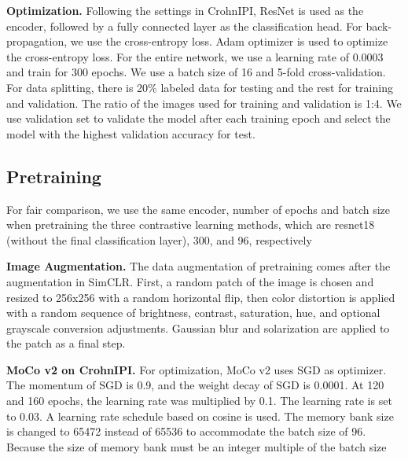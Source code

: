 \documentclass[conference]{IEEEtran}
\begin{document}
\textbf{Optimization.}
Following the settings in CrohnIPI\cite{crohIPI}, ResNet is used as the encoder, followed by a fully connected layer as the classification head. For back-propagation, we use the cross-entropy loss.
Adam optimizer is used to optimize the cross-entropy loss. For the entire network, we use a learning rate of 0.0003 and train for 300 epochs. We use a batch size of 16 and 5-fold cross-validation.
For data splitting, there is 20\% labeled data for testing and the rest for training and validation. The ratio of the images used for training and validation is 1:4.
We use validation set to validate the model after each training epoch and select the model with the highest validation accuracy for test.

\subsection{Pretraining}
 For fair comparison, we use the same encoder, number of epochs and batch size when pretraining the three contrastive learning methods, which are resnet18 (without the final classification layer), 300, and 96, respectively

\textbf{Image Augmentation.}
The data augmentation of pretraining comes after the augmentation in SimCLR\cite{SimCLR}. First, a random patch of the image is chosen and resized to 256x256 with a random horizontal flip, then color distortion is applied with a random sequence of brightness, contrast, saturation, hue, and optional grayscale conversion adjustments. Gaussian blur and solarization are applied to the patch as a final step.

\textbf{MoCo v2 on CrohnIPI.}
For optimization, MoCo v2 uses SGD as optimizer. The momentum of SGD is 0.9, and the weight decay of SGD is 0.0001. At 120 and 160 epochs, the learning rate was multiplied by 0.1. The learning rate is set to 0.03. A learning rate schedule based on cosine is used. The memory bank size is changed to 65472 instead of 65536 to accommodate the batch size of 96. Because the size of memory bank must be an integer multiple of the batch size
\end{document}
